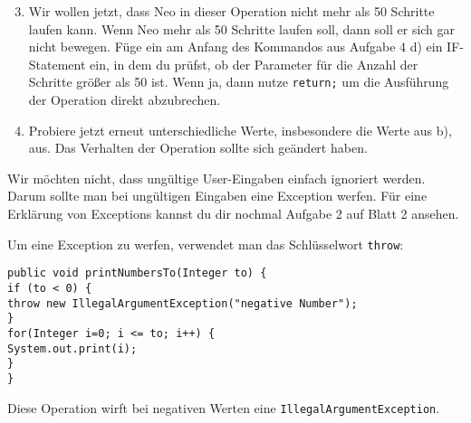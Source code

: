 \begin{enumerate}\setcounter{enumi}{2}
\item
Wir wollen jetzt, dass Neo in dieser Operation nicht mehr als 50 Schritte laufen kann.
Wenn Neo mehr als 50 Schritte laufen soll, dann soll er sich gar nicht bewegen.
Füge ein am Anfang des Kommandos aus Aufgabe 4 d) ein IF-Statement ein, in dem du prüfst, ob der Parameter für die Anzahl der Schritte größer als 50 ist.
Wenn ja, dann nutze \lstinline{return;} um die Ausführung der Operation direkt abzubrechen.

\item
Probiere jetzt erneut unterschiedliche Werte, insbesondere die Werte aus b), aus.
Das Verhalten der Operation sollte sich geändert haben.
\end{enumerate}

\medskip %

\begin{Infobox}
	Wir möchten nicht, dass ungültige User-Eingaben einfach ignoriert werden.
Darum sollte man bei ungültigen Eingaben eine Exception werfen.
Für eine Erklärung von Exceptions kannst du dir nochmal Aufgabe 2 auf Blatt 2 ansehen.\newline

Um eine Exception zu werfen, verwendet man das Schlüsselwort \lstinline{throw}:

\begin{lstlisting}[xleftmargin=0.5cm]
public void printNumbersTo(Integer to) {
if (to < 0) {
throw new IllegalArgumentException("negative Number");
}
for(Integer i=0; i <= to; i++) {
System.out.print(i);
}
}
\end{lstlisting}

Diese Operation wirft bei negativen Werten eine \lstinline{IllegalArgumentException}.
\end{Infobox}


